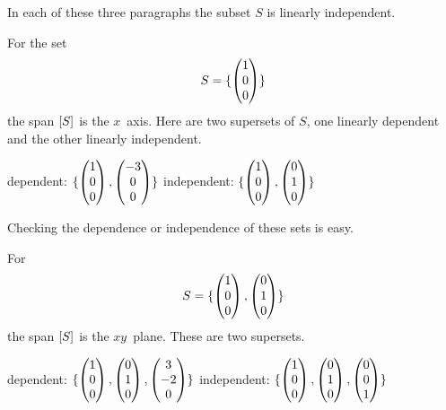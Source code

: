 \begin{example} \label{ex:LinindSetsAndSuper}
In each of these three paragraphs
the subset $S$ is linearly independent.

For the set
\begin{equation*}
  S
   =\mbox{$\{\begin{pmatrix} 1 \\ 0 \\ 0 \end{pmatrix}\}$}
\end{equation*}
the span \( \relax [S\relax ] \) is the \( x \)~axis.
Here are two supersets of $S$, one linearly dependent and the other linearly
independent.
\begin{center}
     dependent:
     \( \mbox{$\{
         \begin{pmatrix} 1 \\ 0 \\ 0 \end{pmatrix},
         \begin{pmatrix} -3 \\ 0 \\ 0 \end{pmatrix}\}$} \)      
     \qquad
     independent:
     \( \mbox{$\{
         \begin{pmatrix} 1 \\ 0 \\ 0 \end{pmatrix},
         \begin{pmatrix} 0 \\ 1 \\ 0 \end{pmatrix}\}$} \)      
\end{center}
Checking the dependence or independence of these sets is easy.

For
\begin{equation*}
  S
   =\mbox{$\{\begin{pmatrix} 1 \\ 0 \\ 0 \end{pmatrix},
          \begin{pmatrix} 0 \\ 1 \\ 0 \end{pmatrix}
                 \}$}
\end{equation*}
the span \( \relax [S\relax ] \) is the \( xy \)~plane.
These are two supersets.
\begin{center}
     dependent:
     \( \mbox{$\{
         \begin{pmatrix} 1 \\ 0 \\ 0 \end{pmatrix},
         \begin{pmatrix} 0 \\ 1 \\ 0 \end{pmatrix},
         \begin{pmatrix} 3 \\ -2 \\ 0 \end{pmatrix} \}$} \)       
     \qquad
     independent:
     \( \mbox{$\{
         \begin{pmatrix} 1 \\ 0 \\ 0 \end{pmatrix},
         \begin{pmatrix} 0 \\ 1 \\ 0 \end{pmatrix},
         \begin{pmatrix} 0 \\ 0 \\ 1 \end{pmatrix} \}$} \)    
\end{center}


\end{example}
